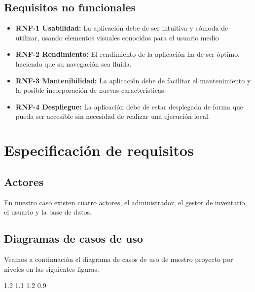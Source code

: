 \subsection{Requisitos no funcionales}

\begin{itemize}
\item \textbf{RNF-1 Usabilidad:} La aplicación debe de ser intuitiva y cómoda de utilizar, usando elementos visuales conocidos para el usuario medio

\item \textbf{RNF-2 Rendimiento:} El rendimiento de la aplicación ha de ser óptimo, haciendo que su navegación sea fluida.

\item \textbf{RNF-3 Mantenibilidad:} La aplicación debe de facilitar el mantenimiento y la posible incorporación de nuevas características.

\item \textbf{RNF-4 Despliegue:} La aplicación debe de estar desplegada de forma que pueda ser accesible sin necesidad de realizar una ejecución local.

\end{itemize}


\section{Especificación de requisitos}

\subsection{Actores}

En nuestro caso existen cuatro actores, el administrador, el gestor de inventario, el usuario y la base de datos.

\subsection{Diagramas de casos de uso}

Veamos a continuación el diagrama de casos de uso de nuestro proyecto por niveles en las siguientes figuras.

 {1.2}
 {1.1}
 {1.2}
 {0.9}

